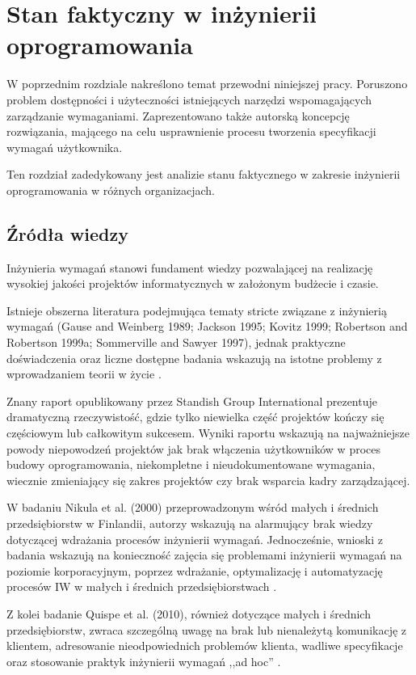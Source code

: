 \chapter{Stan faktyczny w inżynierii oprogramowania}

  W poprzednim rozdziale nakreślono temat przewodni niniejszej pracy. Poru\-szono problem dostępności i użyteczności istniejących narzędzi wspomagających zarządzanie wymaganiami. Zaprezentowano także autorską koncepcję rozwiązania, mającego na celu usprawnienie procesu tworzenia specyfikacji wymagań użytkownika. 

  Ten rozdział zadedykowany jest analizie stanu faktycznego w zakresie inżynierii oprogramowania w różnych organizacjach.  

  \section{Źródła wiedzy}

  Inżynieria wymagań stanowi fundament wiedzy pozwalającej na realizację wysokiej jakości projektów informatycznych w założonym budżecie i czasie. 

  Istnieje obszerna literatura podejmująca tematy stricte związane z inżynierią wymagań (Gause and Weinberg 1989; Jackson 1995; Kovitz 1999; Robertson and Robertson 1999a; Sommerville and Sawyer 1997), jednak praktyczne doświadczenia oraz liczne dostępne badania wskazują na istotne problemy z wprowadzaniem teorii w życie \cite{Boehm06, Niku00, Standish94}.

  Znany raport opublikowany przez Standish Group International \cite{Standish94} prezentuje dramatyczną rzeczywistość, gdzie tylko niewielka część projektów kończy się częściowym lub całkowitym sukcesem. Wyniki raportu wskazują na najważniejsze powody niepowodzeń projektów jak brak włączenia użytkowników w proces budowy oprogramowania, niekompletne i nieudokumentowane wymagania, wiecznie zmieniający się zakres projektów czy brak wsparcia kadry zarządzającej.      
  
  W badaniu Nikula et al. (2000) przeprowadzonym wśród małych i średnich przedsiębiorstw w Finlandii, autorzy wskazują na alarmujący brak wiedzy dotyczącej wdrażania procesów inżynierii wymagań. Jednocześnie, wnioski z badania wskazują na konieczność zajęcia się problemami inżynierii wymagań na poziomie korporacyjnym, poprzez wdrażanie, optymalizację i automatyzację procesów IW w małych i średnich przedsiębiorstwach \cite{Niku00}.
  
  Z kolei badanie Quispe et al. (2010), również dotyczące małych i średnich przedsiębiorstw, zwraca szczególną uwagę na brak lub nienależytą komunikację z klientem, adresowanie nieodpowiednich problemów klienta, wadliwe specyfikacje oraz stosowanie praktyk inżynierii wymagań ,,ad hoc'' \cite{Quispe10}.
  
